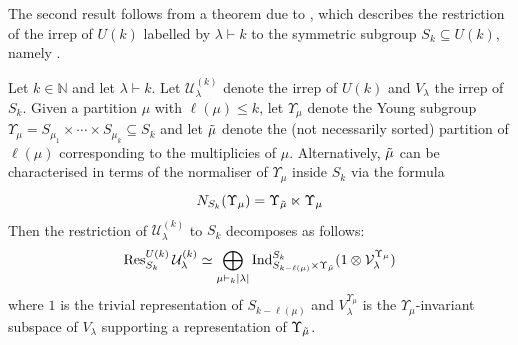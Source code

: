 \documentclass[notitlepage]{article}
\begin{document}
The second result follows from a theorem due to \cite{nishiyama2000restriction}, which describes the restriction of the irrep of $U(k)$ labelled by $\lambda \vdash k$ to the symmetric subgroup $S_k \subseteq U(k)$, namely \cite[Theorem 2.3]{nishiyama2000restriction}.
\begin{thm}
    Let $k \in \mathbb N$ and let $\lambda \vdash k$.
    Let $\mathcal U_{\lambda}^{(k)}$ denote the irrep of $U(k)$ and $V_{\lambda}$ the irrep of $S_k$.
    Given a partition $\mu$ with $\ell(\mu) \leq k$, let $\Upsilon_{\mu}$ denote the Young subgroup $\Upsilon_{\mu} = S_{\mu_1} \times \cdots \times S_{\mu_k} \subseteq S_k$ and let $\tilde \mu$ denote the (not necessarily sorted) partition of $\ell(\mu)$ corresponding to the multiplicies of $\mu$.
    Alternatively, $\tilde \mu$ can be characterised in terms of the normaliser of $\Upsilon_\mu$ inside $S_k$ via the formula
    \begin{equation}
        N_{S_k}(\Upsilon_\mu) = \Upsilon_{\tilde \mu} \ltimes \Upsilon_{\mu}
    \end{equation}
    Then the restriction of $\mathcal U_{\lambda}^{(k)}$ to $S_k$ decomposes as follows:
    \begin{equation}
        \label{eq:nishiyama-decomp}
        \operatorname{Res}^{U(k)}_{S_k} \mathcal U_{\lambda}^{(k)} \simeq \bigoplus_{\mu \vdash_k \left|\lambda\right|} \operatorname{Ind}_{S_{k-\ell(\mu)} \times \Upsilon_{\tilde \mu}}^{S_k}(1 \otimes \mathcal V_\lambda^{\Upsilon_{\mu}})
    \end{equation}
    where $1$ is the trivial representation of $S_{k-\ell(\mu)}$ and $V_\lambda^{\Upsilon_{\mu}}$ is the $\Upsilon_{\mu}$-invariant subspace of $V_{\lambda}$ supporting a representation of $\Upsilon_{\tilde \mu}$.
\end{thm}
\end{document}
